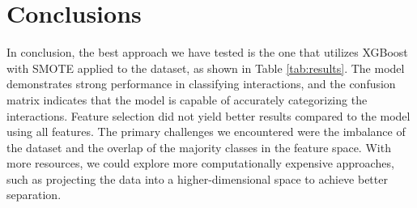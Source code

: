 \documentclass[10pt,twocolumn,letterpaper]{article}
\begin{document}
\section{Conclusions}
In conclusion, the best approach we have tested is the one that utilizes XGBoost with SMOTE applied to the dataset, as shown in Table \ref{tab:results}. 
The model demonstrates strong performance in classifying interactions, and the confusion matrix indicates that the model is capable of accurately categorizing the interactions. 
Feature selection did not yield better results compared to the model using all features. 
The primary challenges we encountered were the imbalance of the dataset and the overlap of the majority classes in the feature space. 
With more resources, we could explore more computationally expensive approaches, such as projecting the data into a higher-dimensional space to achieve better separation.


{\small


}
\end{document}
